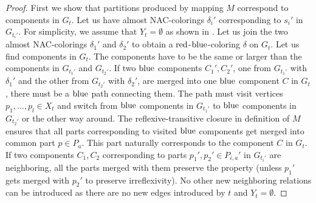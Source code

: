 \begin{proof}
	First we show that partitions produced by mapping \( M \)
	correspond to components in \( G_t \).
	Let us have almost NAC-colorings \( \delta_i' \) corresponding
	to \( s_i' \) in \( G_{t_i'} \).
	For simplicity, we assume that \( Y_t = \emptyset \)
	as shown in .
	Let us join the two almost NAC-colorings \( \delta_1' \) and \( \delta_2' \)
	to obtain a \( \text{red} \)-\( \text{blue} \)-coloring \( \delta \) on \( G_t \).
	Let us find components in \( G_t \).
	The components have to be the same or larger
	than the components in \( G_{t_1'} \) and \( G_{t_2'} \).
	If two \( \text{blue} \) components \( C_1', C_2' \),
	one from \( G_{t_1'} \) with \( \delta_1' \) and
	the other from \( G_{t_2'} \) with \( \delta_2' \),
	are merged into one \( \text{blue} \) component \( C \) in \( G_t \),
	there must be a \( \text{blue} \) path connecting them.
	The path must visit vertices \( p_1, \dots, p_l \in X_t \)
	and switch from \( \text{blue} \) components in \( G_{t_1'} \)
	to \( \text{blue} \) components in \( G_{t_2'} \) or the other way around.
	The reflexive-transitive closure in definition of \( M \) ensures that
	all parts corresponding to visited \( \text{blue} \) components
	get merged into common part \( p \in P_a \).
	This part naturally corresponds to the component \( C \) in \( G_t \).
	If two components \( C_1, C_2 \) corresponding to
	parts \( p_1', p_2' \in P_{i,a}' \) in \( G_{t_i'} \) are neighboring,
	all the parts merged with them preserve the property
	(unless \( p_1' \) gets merged with \( p_2' \) to preserve irreflexivity).
	No other new neighboring relations can be introduced
	as there are no new edges introduced by \( t \) and \( Y_t = \emptyset \).


\end{proof}
